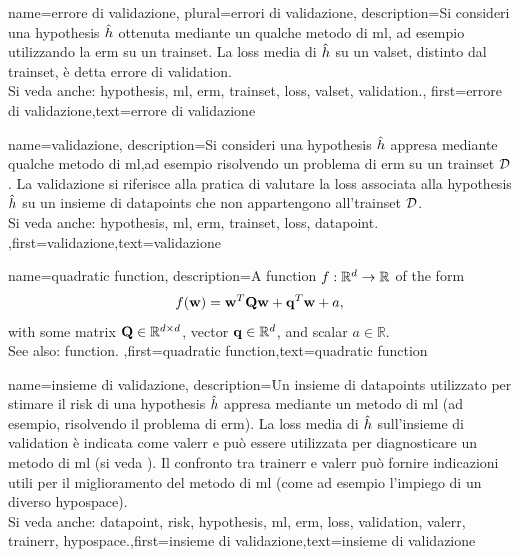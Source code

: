 {name={errore di validazione}, plural={errori di validazione},
 description={Si consideri una \gls{hypothesis} $\hat{h}$ ottenuta 
 mediante un qualche metodo di \gls{ml}, ad esempio utilizzando la \gls{erm} su un \gls{trainset}. La \gls{loss} media
 	di $\hat{h}$ su un \gls{valset}, distinto dal \gls{trainset}, è detta
 	errore di \gls{validation}.
			\\
		Si veda anche: \gls{hypothesis}, \gls{ml}, \gls{erm}, \gls{trainset}, \gls{loss}, \gls{valset}, \gls{validation}.},
		first={errore di validazione},text={errore di validazione}  
}

{name={validazione},
	description={Si consideri una \gls{hypothesis} $\hat{h}$ appresa mediante 
	qualche metodo di \gls{ml},ad esempio risolvendo un problema di \gls{erm} su un \gls{trainset} $\mathcal{D}$. 
		La validazione si riferisce alla pratica di valutare la \gls{loss} associata alla 
		\gls{hypothesis} $\hat{h}$ su un insieme di
		\glspl{datapoint} che non appartengono all'\gls{trainset} $\mathcal{D}$.
				\\
		Si veda anche: \gls{hypothesis}, \gls{ml}, \gls{erm}, \gls{trainset}, \gls{loss}, \gls{datapoint}. },first={validazione},text={validazione}  
}

{name={quadratic function},
	description={A \gls{function} $f: \mathbb{R}^{d} \rightarrow \mathbb{R}$ of the form 
	$$f({\bf w}) =  {\bf w}^{T} \mathbf{Q} \mathbf{w} + \mathbf{q}^{T} {\bf w}+a,$$ with 
	some matrix $\mathbf{Q} \in \mathbb{R}^{d \times d}$, vector ${\bf q} \in \mathbb{R}^{d}$, 
	and scalar $a \in \mathbb{R}$.
	\\
	See also: \gls{function}. },first={quadratic function},text={quadratic function}  
}

{name={insieme di validazione},
  description={Un insieme di \glspl{datapoint} utilizzato per stimare 
  il \gls{risk} di una \gls{hypothesis} $\hat{h}$ appresa mediante un metodo di 
  	\gls{ml} (ad esempio, risolvendo il problema di \gls{erm}). La \gls{loss} media di $\hat{h}$ 
  	sull'insieme di \gls{validation} è indicata come \gls{valerr} e può essere utilizzata per diagnosticare un metodo di 
  	\gls{ml} (si veda \cite[Sec. 6.6]{MLBasics}). Il confronto tra \gls{trainerr} 
  	e \gls{valerr} può fornire indicazioni utili per il miglioramento del metodo di \gls{ml} (come ad esempio l'impiego di un 
	diverso \gls{hypospace}).
			\\
		Si veda anche: \gls{datapoint}, \gls{risk}, \gls{hypothesis}, \gls{ml}, \gls{erm}, \gls{loss}, \gls{validation}, \gls{valerr}, \gls{trainerr}, \gls{hypospace}.},first={insieme di validazione},text={insieme di validazione}  
}

